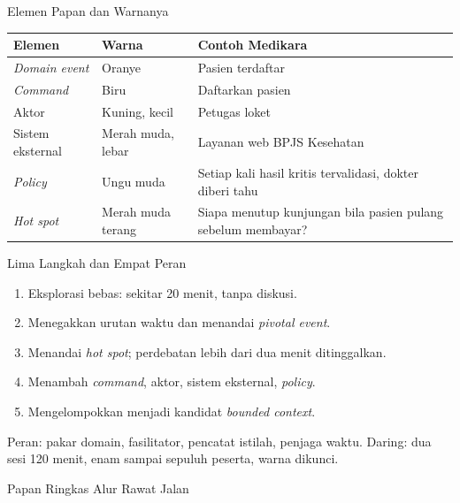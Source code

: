 \documentclass[aspectratio=169, table, 12pt]{beamer}
\begin{document}
\begin{frame}{{\Large Elemen Papan dan Warnanya}}
  \footnotesize
  \begin{tabularx}{\textwidth}{>{\raggedright\arraybackslash}p{2.8cm}
      >{\raggedright\arraybackslash}p{3.0cm} >{\raggedright\arraybackslash}X}
    \hline
    \textbf{Elemen} & \textbf{Warna} & \textbf{Contoh Medikara} \\
    \hline
    \textit{Domain event} & Oranye & Pasien terdaftar \\
    \hline
    \textit{Command} & Biru & Daftarkan pasien \\
    \hline
    Aktor & Kuning, kecil & Petugas loket \\
    \hline
    Sistem eksternal & Merah muda, lebar & Layanan web BPJS Kesehatan \\
    \hline
    \textit{Policy} & Ungu muda & Setiap kali hasil kritis tervalidasi, dokter
      diberi tahu \\
    \hline
    \textit{Hot spot} & Merah muda terang & Siapa menutup kunjungan bila pasien
      pulang sebelum membayar? \\
    \hline
  \end{tabularx}
\end{frame}

\begin{frame}{{\Large Lima Langkah dan Empat Peran}}
  \small
  \begin{enumerate}
    \item Eksplorasi bebas: sekitar 20 menit, tanpa diskusi.
    \item Menegakkan urutan waktu dan menandai \textit{pivotal event}.
    \item Menandai \textit{hot spot}; perdebatan lebih dari dua menit ditinggalkan.
    \item Menambah \textit{command}, aktor, sistem eksternal, \textit{policy}.
    \item Mengelompokkan menjadi kandidat \textit{bounded context}.
  \end{enumerate}
  \vspace{4pt}
  \footnotesize
  Peran: pakar domain, fasilitator, pencatat istilah, penjaga waktu. Daring: dua
  sesi 120 menit, enam sampai sepuluh peserta, warna dikunci.
\end{frame}

\begin{frame}{{\Large Papan Ringkas Alur Rawat Jalan}}
  \centering
\end{frame}
\end{document}
